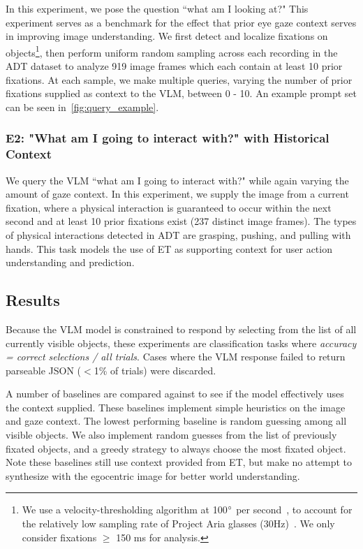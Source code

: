 In this experiment, we pose the question ``what am I looking at?"  This experiment serves as a benchmark for the effect that prior eye gaze context serves in improving image understanding.  We first detect and localize fixations on objects\footnote{We use a velocity-thresholding algorithm at 100$\degree$ per second~\cite{salvucci_fixations_2000}, to account for the relatively low sampling rate of Project Aria glasses (30Hz)~\cite{engel_aria_2023}.  We only consider fixations $\geq$ 150 ms for analysis.}, then perform uniform random sampling across each recording in the ADT dataset to analyze 919 image frames which each contain at least 10 prior fixations.  At each sample, we make multiple queries, varying the number of prior fixations supplied as context to the VLM, between 0 - 10.  An example prompt set can be seen in~\autoref{fig:query_example}.

\subsubsection{E2: "What am I going to interact with?" with Historical Context}

We query the VLM ``what am I going to interact with?" while again varying the amount of gaze context.  In this experiment, we supply the image from a current fixation, where a physical interaction is guaranteed to occur within the next second and at least 10 prior fixations exist (237 distinct image frames).  The types of physical interactions detected in ADT are grasping, pushing, and pulling with hands.  This task models the use of ET as supporting context for user action understanding and prediction.

\subsection{Results}

Because the VLM model is constrained to respond by selecting from the list of all currently visible objects, these experiments are classification tasks where \textit{accuracy = correct selections / all trials}.  Cases where the VLM response failed to return parseable JSON ($<$1\% of trials) were discarded.

A number of baselines are compared against to see if the model effectively uses the context supplied.  These baselines implement simple heuristics on the image and gaze context.  The lowest performing baseline is random guessing among all visible objects.  We also implement random guesses from the list of previously fixated objects, and a greedy strategy to always choose the most fixated object.  Note these baselines still use context provided from ET, but make no attempt to synthesize with the egocentric image for better world understanding.


